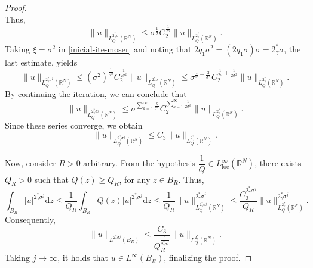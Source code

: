 \documentclass[10pt,a4paper]{amsart}
\newcommand{\R}{\mathbb{R}}
\begin{document}
\begin{proof}
$$	$$
Thus,
	$$
\|u\|_{L^{2_\gamma^*\sigma}_Q(\mathbb{R}^N)} \leq \sigma^{\frac{1}{\sigma}} C_2^{\frac{1}{2\sigma}}\|u\|_{L^{2_\gamma^*}_Q(\mathbb{R}^N)}.
	$$
    Taking $\xi=\sigma^2$ in \eqref{inicial-ite-moser} and noting that $2q_1\sigma^2=(2q_1\sigma)\sigma = 2_\gamma^*\sigma$, the last estimate, yields
	$$
	\|u\|_{L^{2_\gamma^*\sigma^2}_Q(\mathbb{R}^N)} \leq (\sigma^2)^{\frac{1}{\sigma^2}} C_2^{\frac{1}{2\sigma^2}}\|u\|_{L^{2_\gamma^*\sigma}_Q(\mathbb{R}^N)} \leq \sigma^{\frac{1}{\sigma}+\frac{2}{\sigma^2}}C_2^{\frac{1}{2\sigma} + \frac{1}{2\sigma^2}}\|u\|_{L^{2_\gamma^*}_Q(\mathbb{R}^N)}.
	$$
By continuing the iteration, we can conclude that
	$$
	\|u\|_{L^{2_\gamma^*\sigma^j}_Q(\mathbb{R}^N)} \leq \sigma^{\sum_{k=1}^\infty \frac{k}{\sigma^k}} C_2^{\sum_{k=1}^\infty \frac{1}{2\sigma^k}}\|u\|_{L_Q^{2_\gamma^*}(\mathbb{R}^N)}.
	$$
Since these series converge, we obtain
	$$
	\|u\|_{L^{2_\gamma^*\sigma^j}_Q(\mathbb{R}^N)} \leq C_3\|u\|_{L_Q^{2_\gamma^*}(\mathbb{R}^N)}.
	$$


    Now, consider $R>0$ arbitrary. From the hypothesis $\dfrac{1}{Q} \in L^\infty_{\mathrm{loc}}(\R^N)$, there exists $Q_R>0$ such that $Q(z) \geq Q_R$, for any $z \in B_R$. Thus,
	$$
	\int_{B_R}|u|^{2_\gamma^*\sigma^j} \mathrm{d}z \leq \frac{1}{Q_R}\int_{B_R}Q(z)|u|^{2_\gamma^*\sigma^j} \mathrm{d}z \leq \frac{1}{Q_R}\|u\|_{L^{2_\gamma^*\sigma^j}_Q(\mathbb{R}^N)}^{2_\gamma^*\sigma^j} \leq \frac{C_3^{2_\gamma^*\sigma^j}}{Q_R}\|u\|_{L^{2_\gamma^*}_Q(\mathbb{R}^N)}^{2_\gamma^*\sigma^j}.
	$$
Consequently,
	$$
	\|u\|_{L^{2_\gamma^*\sigma^j}(B_R)} \leq \frac{C_3}{Q_R^{\frac{1}{2_\gamma^*\sigma^j}}}\|u\|_{L_Q^{2_\gamma^*}(\mathbb{R}^N)}.
	$$
Taking $j \to \infty$, it holds that $u \in L^\infty(B_R)$, finalizing the proof.
\end{proof}
\end{document}
